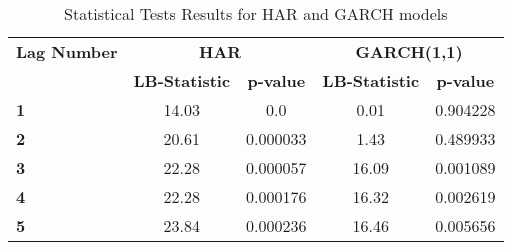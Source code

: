 \begin{table}[ht]
\centering
\begin{tabular}{|l|cc|cc|}
\hline
\textbf{Lag Number} & \multicolumn{2}{c|}{\textbf{HAR}} & \multicolumn{2}{c|}{\textbf{GARCH(1,1)}} \\
\textbf{} & \textbf{LB-Statistic} & \textbf{p-value} & \textbf{LB-Statistic} & \textbf{p-value} \\
\hline
\textbf{1} & 14.03 & 0.0 & 0.01 & 0.904228 \\
\hline
\textbf{2} & 20.61 & 0.000033 & 1.43 & 0.489933 \\
\hline
\textbf{3} & 22.28 & 0.000057 & 16.09 & 0.001089 \\
\hline
\textbf{4} & 22.28 & 0.000176 & 16.32 & 0.002619 \\
\hline
\textbf{5} & 23.84 & 0.000236 & 16.46 & 0.005656 \\
\hline
\end{tabular}
\caption{Statistical Tests Results for HAR and GARCH models}
\label{tab:lijung_test}





\end{table}
